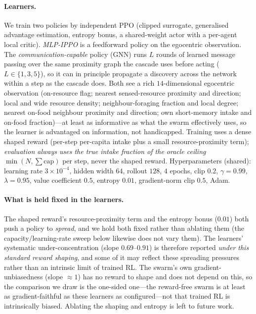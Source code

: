 \documentclass{article}
\begin{document}
\paragraph{Learners.} We train two policies by independent PPO (clipped surrogate, generalised advantage
estimation, entropy bonus, a shared-weight actor with a per-agent local critic). \emph{MLP-IPPO} is a
feedforward policy on the egocentric observation. The \emph{communication-capable} policy (GNN) runs $L$ rounds
of learned message passing over the same proximity graph the cascade uses before acting ($L\in\{1,3,5\}$), so it
can in principle propagate a discovery across the network within a step as the cascade does. Both see a rich
$14$-dimensional egocentric observation (on-resource flag; nearest sensed-resource proximity and direction;
local and wide resource density; neighbour-foraging fraction and local degree; nearest on-food neighbour
proximity and direction; own short-memory intake and on-food fraction)---at least as informative as what the
swarm effectively uses, so the learner is advantaged on information, not handicapped. Training uses a dense
shaped reward (per-step per-capita intake plus a small resource-proximity term); \emph{evaluation always uses
the true intake fraction of the oracle ceiling} $\min(N,\sum\text{cap})$ per step, never the shaped reward.
Hyperparameters (shared): learning rate $3\times10^{-4}$, hidden width $64$, rollout $128$, $4$ epochs,
clip $0.2$, $\gamma=0.99$, $\lambda=0.95$, value coefficient $0.5$, entropy $0.01$, gradient-norm clip $0.5$,
Adam.

\paragraph{What is held fixed in the learners.} The shaped reward's resource-proximity term and the entropy
bonus ($0.01$) both push a policy to \emph{spread}, and we hold both fixed rather than ablating them (the
capacity/learning-rate sweep below likewise does not vary them). The learners' systematic under-concentration
(slope $0.69$--$0.91$) is therefore reported \emph{under this standard reward shaping}, and some of it may reflect
these spreading pressures rather than an intrinsic limit of trained RL. The swarm's own gradient-unbiasedness
(slope ${\approx}1$) has no reward to shape and does not depend on this, so the comparison we draw is the
one-sided one---the reward-free swarm is at least as gradient-faithful as these learners as configured---not that
trained RL is intrinsically biased. Ablating the shaping and entropy is left to future work.
\end{document}
